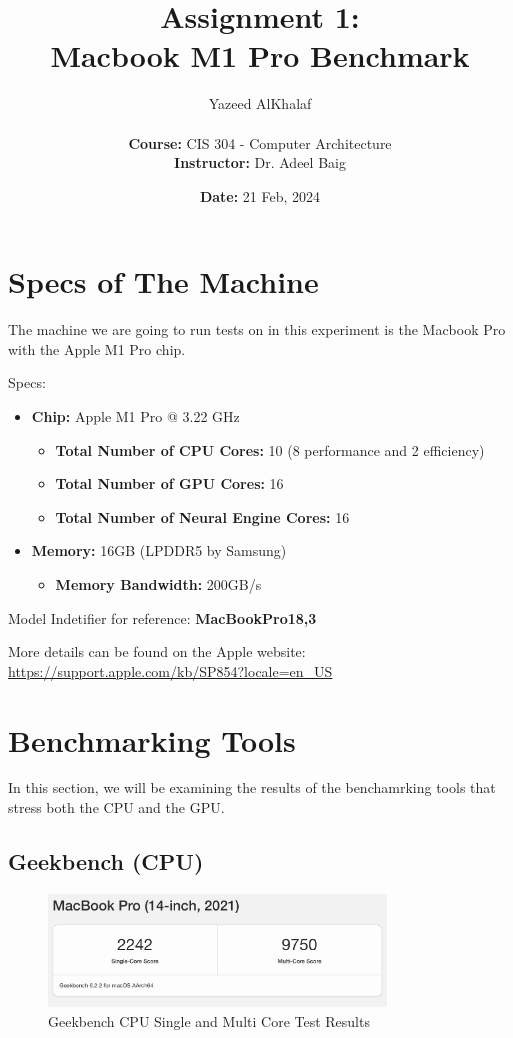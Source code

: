 \documentclass[a4paper]{article}
\title{\textbf{Assignment 1:\\Macbook M1 Pro Benchmark}}
\author{
    Yazeed AlKhalaf\\
    \\
    \textbf{Course:} CIS 304 - Computer Architecture\\
    \textbf{Instructor:} Dr. Adeel Baig
}
\date{\textbf{Date:} 21 Feb, 2024}
\begin{document}
\maketitle

\newpage

\tableofcontents

\newpage

\section{Specs of The Machine}

The machine we are going to run tests on in this experiment is the Macbook Pro with the Apple M1 Pro chip.

Specs:
\begin{itemize}
    \item \textbf{Chip:} Apple M1 Pro @ 3.22 GHz
    \begin{itemize}
        \item \textbf{Total Number of CPU Cores:} 10 (8 performance and 2 efficiency)
        \item \textbf{Total Number of GPU Cores:} 16
        \item \textbf{Total Number of Neural Engine Cores:} 16
    \end{itemize}
    \item \textbf{Memory:} 16GB (LPDDR5 by Samsung)
    \begin{itemize}
        \item \textbf{Memory Bandwidth:} 200GB/s
    \end{itemize}
\end{itemize}

Model Indetifier for reference: \textbf{MacBookPro18,3}

More details can be found on the Apple website: \url{https://support.apple.com/kb/SP854?locale=en_US}

\section{Benchmarking Tools}

In this section, we will be examining the results of the benchamrking tools that stress both the CPU and the GPU.

\subsection{Geekbench (CPU)}

\begin{figure}[h!]
    \centering
    \includegraphics[width=0.8\textwidth]{images/geekbench-single-multi-core.png}
    \caption{Geekbench CPU Single and Multi Core Test Results}
    \label{fig:geekbench-single-multi-core}
\end{figure}
\end{document}
